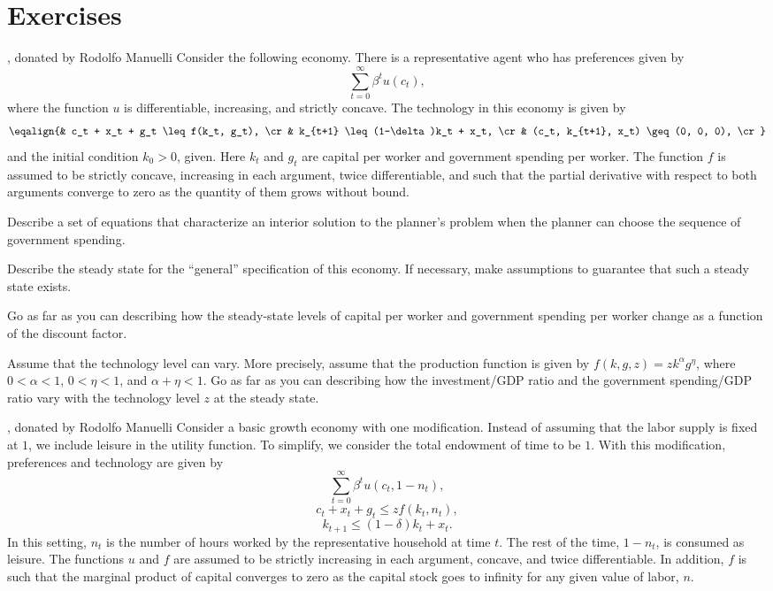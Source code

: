 \section{Exercises}
\showchaptIDtrue
\showsectIDtrue
\medskip
{} ,
donated by Rodolfo Manuelli
\medskip\noindent
Consider the following economy. There is a representative agent
who has preferences given by
$$ \sum_{t=0}^\infty \beta^t u(c_t), $$
where the function $u$ is differentiable, increasing, and strictly
concave.  The technology in this economy is given by
$$ \eqalign{& c_t + x_t + g_t \leq f(k_t, g_t),    \cr
   & k_{t+1} \leq (1-\delta)k_t + x_t, \cr
   & (c_t, k_{t+1}, x_t) \geq (0, 0, 0), \cr}  $$
and the initial condition $k_0 > 0$, given. Here
$k_t$ and $g_t$ are capital per worker and government spending per worker.
  The function $f$ is
assumed to be strictly concave, increasing in each argument,
twice differentiable,
and such that the partial derivative with respect to both arguments converge
to zero as the quantity of them grows without bound.
\medskip

 Describe a set of equations that
characterize an interior solution to the planner's
problem when the planner can choose the
sequence of government spending.
\medskip

 Describe the steady state for the ``general'' specification
of this economy.  If necessary, make assumptions to guarantee
that such a steady state exists.
\medskip

 Go as far as you can describing how the steady-state
levels of capital per worker and government spending per worker change
as a function of the discount factor.
\medskip

 Assume that the technology level can vary.  More precisely,
assume that the production function is given by
 $f(k,g,z) = zk^\alpha g^\eta$, where $0<\alpha<1$, $0<\eta<1$, and
$\alpha+\eta<1$.  Go as far as you can describing how the investment/GDP
 ratio and the government spending/GDP ratio vary with the technology level
$z$ at the steady state.

\medskip
{}  , donated
by Rodolfo Manuelli
\medskip\noindent
Consider a basic growth  economy with one modification.
Instead of assuming that the labor supply is fixed at $1$, we
include leisure in the utility function. %
To simplify, we consider the total endowment of time to be $1$.
  With this modification, preferences and technology are given by
\medskip
$$
 \sum_{t=0}^\infty \beta^t u(c_t, 1-n_t) , $$
$$c_t + x_t + g_t \leq zf(k_t, n_t),  $$
$$k_{t+1} \leq (1-\delta)k_t + x_t. $$
\medskip\noindent
In this setting, $n_t$ is the number of hours worked by
the representative household at time $t$.  The rest of
the time, $1-n_t$, is consumed as leisure.  The
functions $u$ and $f$ are assumed to be strictly increasing in
each argument, concave, and twice differentiable.  In addition,
$f$ is such that the marginal product of capital converges to
zero as the capital stock goes to infinity for any given value of labor, $n$.
\medskip

